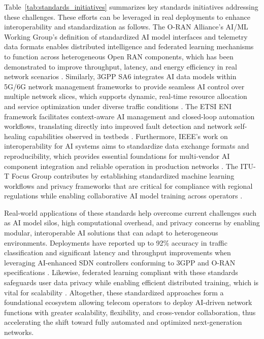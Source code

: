 \documentclass[sigconf]{acmart}
\begin{document}
Table~\ref{tab:standards_initiatives} summarizes key standards initiatives addressing these challenges. These efforts can be leveraged in real deployments to enhance interoperability and standardization as follows. The O-RAN Alliance's AI/ML Working Group's definition of standardized AI model interfaces and telemetry data formats enables distributed intelligence and federated learning mechanisms to function across heterogeneous Open RAN components, which has been demonstrated to improve throughput, latency, and energy efficiency in real network scenarios \cite{ref54}. Similarly, 3GPP SA6 integrates AI data models within 5G/6G network management frameworks to provide seamless AI control over multiple network slices, which supports dynamic, real-time resource allocation and service optimization under diverse traffic conditions \cite{ref52}. The ETSI ENI framework facilitates context-aware AI management and closed-loop automation workflows, translating directly into improved fault detection and network self-healing capabilities observed in testbeds \cite{ref52}. Furthermore, IEEE's work on interoperability for AI systems aims to standardize data exchange formats and reproducibility, which provides essential foundations for multi-vendor AI component integration and reliable operation in production networks \cite{ref48}. The ITU-T Focus Group contributes by establishing standardized machine learning workflows and privacy frameworks that are critical for compliance with regional regulations while enabling collaborative AI model training across operators \cite{ref54}. 

Real-world applications of these standards help overcome current challenges such as AI model silos, high computational overhead, and privacy concerns by enabling modular, interoperable AI solutions that can adapt to heterogeneous environments. Deployments have reported up to 92\% accuracy in traffic classification and significant latency and throughput improvements when leveraging AI-enhanced SDN controllers conforming to 3GPP and O-RAN specifications \cite{ref52}. Likewise, federated learning compliant with these standards safeguards user data privacy while enabling efficient distributed training, which is vital for scalability \cite{ref54}. Altogether, these standardized approaches form a foundational ecosystem allowing telecom operators to deploy AI-driven network functions with greater scalability, flexibility, and cross-vendor collaboration, thus accelerating the shift toward fully automated and optimized next-generation networks. 
\end{document}
